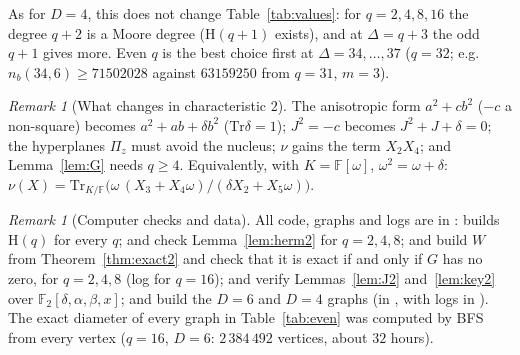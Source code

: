 \documentclass[11pt]{amsart}
\theoremstyle{definition}
\theoremstyle{remark}
\newtheorem{remark}[theorem]{Remark}
\newcommand{\F}{\mathbb{F}}
\newcommand{\Hq}{\mathrm{H}}
\newcommand{\Tr}{\mathrm{Tr}}
\begin{document}
As for $D=4$, this does not change Table~\ref{tab:values}: for $q=2,4,8,16$ the degree $q+2$ is a Moore degree ($\Hq(q+1)$ exists), and at $\Delta=q+3$ the odd $q+1$ gives more. Even $q$ is the best choice first at $\Delta=34,\dots,37$ ($q=32$; e.g.\ $n_b(34,6)\ge 71502028$ against $63159250$ from $q=31$, $m=3$).

\begin{remark}[What changes in characteristic $2$]
The anisotropic form $a^2+cb^2$ ($-c$ a non-square) becomes $a^2+ab+\delta b^2$ ($\Tr\delta=1$); $J^2=-c$ becomes $J^2+J+\delta=0$; the hyperplanes $\Pi_z$ must avoid the nucleus; $\nu$ gains the term $X_2X_4$; and Lemma~\ref{lem:G} needs $q\ge4$. Equivalently, with $K=\F[\omega]$, $\omega^2=\omega+\delta$: $\nu(X)=\Tr_{K/\F}\bigl(\omega\,(X_3+X_4\omega)/(\delta X_2+X_5\omega)\bigr)$.
\end{remark}

\begin{remark}[Computer checks and data]\label{rem:evendata}
All code, graphs and logs are in :  builds $\Hq(q)$ for every $q$;  and  check Lemma~\ref{lem:herm2} for $q=2,4,8$;  and  build $W$ from Theorem~\ref{thm:exact2} and check that it is exact if and only if $G$ has no zero, for $q=2,4,8$ (log  for $q=16$);  and  verify Lemmas~\ref{lem:J2} and~\ref{lem:key2} over $\mathbb F_2[\delta,\alpha,\beta,x]$;  and  build the $D=6$ and $D=4$ graphs (in , with logs in ). The exact diameter of every graph in Table~\ref{tab:even} was computed by BFS from every vertex ($q=16$, $D=6$: $2\,384\,492$ vertices, about $32$ hours).
\end{remark}
\end{document}
